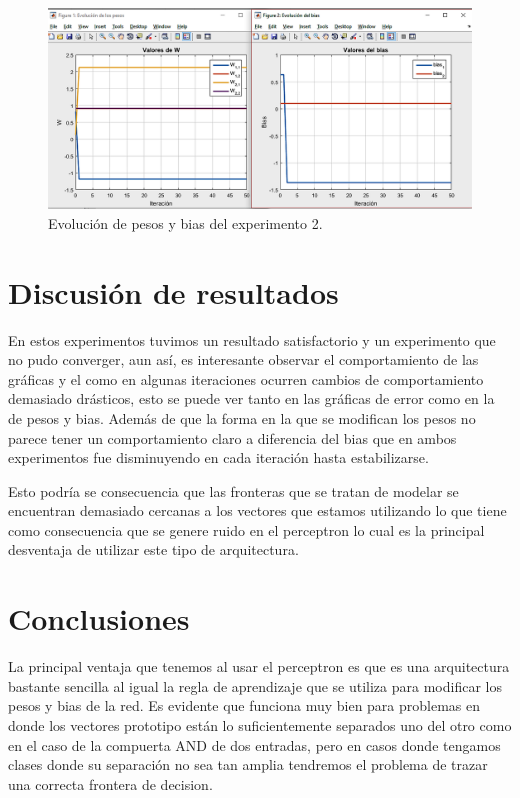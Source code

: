 \documentclass[12pt, titlepage]{article}
\begin{document}
\begin{figure}[H]
    \begin{center}
        \includegraphics[width=15cm]{img/perceptron2/pesosbias.png}
        \caption{Evolución de pesos y bias del experimento 2.}
        \label{fig:pesosbias2}
    \end{center}
\end{figure}
\newpage
    \section{Discusión de resultados}
    En estos experimentos tuvimos un resultado satisfactorio y un experimento que no pudo converger, aun así, es interesante observar el comportamiento de las gráficas y el como en algunas iteraciones ocurren cambios de comportamiento demasiado drásticos, esto se puede ver tanto en las gráficas de error como en la de pesos y bias. Además de que la forma en la que se modifican los pesos no parece tener un comportamiento claro a diferencia del bias que en ambos experimentos fue disminuyendo en cada iteración hasta estabilizarse.
    
    Esto podría se consecuencia que las fronteras que se tratan de modelar se encuentran demasiado cercanas a los vectores que estamos utilizando lo que tiene como consecuencia que se genere ruido en el perceptron lo cual es la principal desventaja de utilizar este tipo de arquitectura.
    \newpage
     \section{Conclusiones}
     La principal ventaja que tenemos al usar el perceptron es que es una arquitectura bastante sencilla al igual la regla de aprendizaje que se utiliza para modificar los pesos y bias de la red. Es evidente que funciona muy bien para problemas en donde los vectores prototipo están lo suficientemente separados uno del otro como en el caso de la compuerta AND de dos entradas, pero en casos donde tengamos clases donde su separación no sea tan amplia tendremos el problema de trazar una correcta frontera de decision.
     
\end{document}
